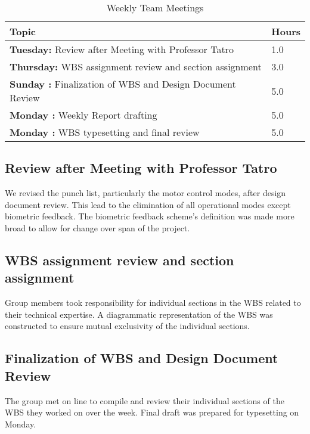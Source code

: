 \documentclass[12pt,compsoc]{IEEEtran}
\begin{document}
	\begin{table}[ht]
		\renewcommand{\arraystretch}{1.3}
		\caption{Weekly Team Meetings}
		
		\label{Team Hour Summary}
		
		\centering
		\begin{tabular}{p{7cm}|p{1cm}}
		\hline
		{\bfseries 	Topic} 																		&{\bfseries Hours}		\\
		\hline\hline
					{\bfseries Tuesday:}  Review after Meeting with Professor Tatro  			& 1.0					\\
					{\bfseries Thursday:} WBS assignment review and section assignment			& 3.0					\\
					{\bfseries Sunday :}  Finalization of WBS and Design Document Review		& 5.0					\\
					{\bfseries Monday :}  Weekly Report drafting								& 5.0					\\
					{\bfseries Monday :}  WBS typesetting and final review 						& 5.0					\\
		\hline
		\end{tabular}
	\end{table}
		 
	\subsection{Review after Meeting with Professor Tatro}
		We revised the punch list, particularly the motor control modes, after design document review.
		This lead to the elimination of all operational modes except biometric feedback. The biometric
		feedback scheme's definition was made more broad to allow for change over span of the project.
				
	\subsection{WBS assignment review and section assignment}
		Group members took responsibility for individual sections in the WBS related to their technical
		expertise. A diagrammatic representation of the WBS was constructed to ensure mutual exclusivity
		of the individual sections.

	\subsection{Finalization of WBS and Design Document Review}
		The group met on line to compile and review their individual sections of the WBS they worked on
		over the week. Final draft was prepared for typesetting on Monday.
\end{document}
